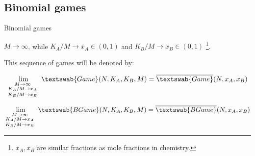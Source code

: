 \documentclass{beamer}
\theoremstyle{definition}
\begin{document}
\subsection{Binomial games}

\begin{frame}{Binomial games}

$M \to \infty$, while $K_A/M \to x_A \in (0,1)$ and $K_B/M \to x_B \in (0,1)$ \footnote{$x_A, x_B$ are similar fractions as mole fractions in chemistry.}.

This sequence of games will be denoted by:

\begin{equation}
    \lim_{\begin{smallmatrix} M \to \infty & \\ K_A/M \to x_A \\ K_B/M \to x_B \end{smallmatrix}} \textswab{Game}(N, K_A, K_B, M) = \overline{\textswab{Game}}(N, x_A, x_B)
\end{equation}

\begin{equation}
    \lim_{\begin{smallmatrix} M \to \infty & \\ K_A/M \to x_A \\ K_B/M \to x_B \end{smallmatrix}} \textswab{BGame}(N, K_A, K_B, M) = \overline{\textswab{BGame}}(N, x_A, x_B)
\end{equation}
    
\end{frame}
\end{document}

